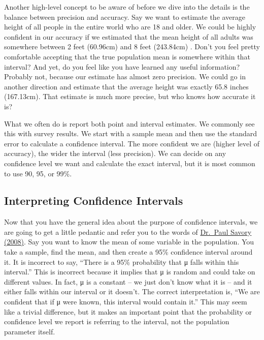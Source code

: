 \documentclass[
  letterpaper,
  DIV=11,
  numbers=noendperiod]{scrreprt}
\begin{document}
Another high-level concept to be aware of before we dive into the
details is the balance between precision and accuracy. Say we want to
estimate the average height of all people in the entire world who are 18
and older. We could be highly confident in our accuracy if we estimated
that the mean height of all adults was somewhere between 2 feet
(60.96cm) and 8 feet (243.84cm) . Don't you feel pretty comfortable
accepting that the true population mean is somewhere within that
interval? And yet, do you feel like you have learned any useful
information? Probably not, because our estimate has almost zero
precision. We could go in another direction and estimate that the
average height was exactly 65.8 inches (167.13cm). That estimate is much
more precise, but who knows how accurate it is?

What we often do is report both point and interval estimates. We
commonly see this with survey results. We start with a sample mean and
then use the standard error to calculate a confidence interval. The more
confident we are (higher level of accuracy), the wider the interval
(less precision). We can decide on any confidence level we want and
calculate the exact interval, but it is most common to use 90, 95, or
99\%.

\subsection{Interpreting Confidence
Intervals}\label{interpreting-confidence-intervals}

Now that you have the general idea about the purpose of confidence
intervals, we are going to get a little pedantic and refer you to the
words of
\href{https://digitalcommons.unl.edu/cgi/viewcontent.cgi?referer=&httpsredir=1&article=1009&context=imseteach}{Dr.~Paul
Savory (2008)}. Say you want to know the mean of some variable in the
population. You take a sample, find the mean, and then create a 95\%
confidence interval around it. It is incorrect to say, ``There is a 95\%
probability that μ falls within this interval.'' This is incorrect
because it implies that μ is random and could take on different values.
In fact, μ is a constant -- we just don't know what it is -- and it
either falls within our interval or it doesn't. The correct
interpretation is, ``We are confident that if μ were known, this
interval would contain it.'' This may seem like a trivial difference,
but it makes an important point that the probability or confidence level
we report is referring to the interval, not the population parameter
itself.
\end{document}
